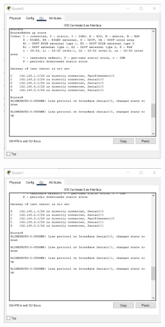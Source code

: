 \documentclass{article}
\begin{document}
\section{}%
\begin{figure}[H]
    \centering
    \includegraphics[width=0.75\textwidth]{figures/22.jpg}
    \caption{}
    \label{fig:fig1}
\end{figure}
\begin{figure}[H]
    \centering
    \includegraphics[width=0.75\textwidth]{figures/23.jpg}
    \caption{}
    \label{fig:fig1}
\end{figure}
\end{document}
